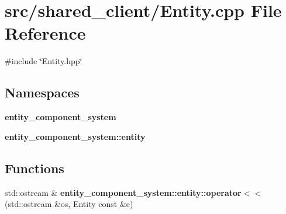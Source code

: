 \section{src/shared\+\_\+client/\+Entity.cpp File Reference}
\label{client_2_entity_8cpp}
{\ttfamily \#include \char`\"{}Entity.\+hpp\char`\"{}}\newline
\subsection*{Namespaces}
\begin{DoxyCompactItemize}
\item 
 {\bf entity\+\_\+component\+\_\+system}
\item 
 {\bf entity\+\_\+component\+\_\+system\+::entity}
\end{DoxyCompactItemize}
\subsection*{Functions}
\begin{DoxyCompactItemize}
\item 
std\+::ostream \& {\bf entity\+\_\+component\+\_\+system\+::entity\+::operator$<$$<$} (std\+::ostream \&os, Entity const \&e)
\end{DoxyCompactItemize}
